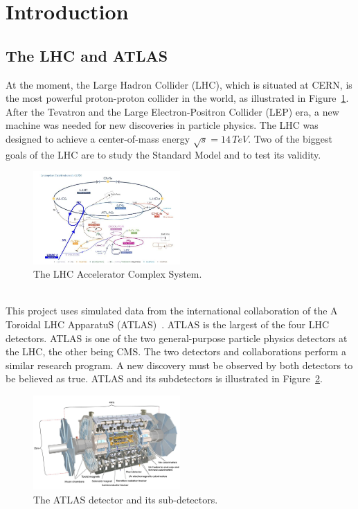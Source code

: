 \section{Introduction}
\label{sec:Introduction}

\subsection{The LHC and ATLAS}
\label{sec:LHC_ATLAS}

At the moment, the Large Hadron Collider (LHC), which is situated at CERN, is the most powerful proton-proton collider in the world, as illustrated in Figure~\ref{fig:LHC}. After the Tevatron and the Large Electron-Positron Collider (LEP) era, a new machine was needed for new discoveries in particle physics. The LHC was designed to achieve a center-of-mass energy $\sqrt{s}=14\,TeV$. Two of the biggest goals of the LHC are to study the Standard Model and to test its validity.  

\begin{figure}[h]
  \centering
  \includegraphics[width=0.5\textwidth]{plots/LHC.png} 
  \caption{The LHC Accelerator Complex System.}
  \label{fig:LHC}
\end{figure}

\ \\This project uses simulated data from the international collaboration of the A Toroidal LHC ApparatuS (ATLAS)~\cite{ATLAS}. ATLAS is the largest of the four LHC detectors. ATLAS is one of the two general-purpose particle physics detectors at the LHC, the other being CMS. The two detectors and collaborations perform a similar research program. A new discovery must be observed by both detectors to be believed as true. ATLAS and its subdetectors is illustrated in Figure~\ref{fig:ATLAS}.

\begin{figure}[h]
  \centering
  \includegraphics[width=0.5\textwidth]{plots/ATLAS.jpg} 
  \caption{The ATLAS detector and its sub-detectors.}
  \label{fig:ATLAS}
\end{figure}


